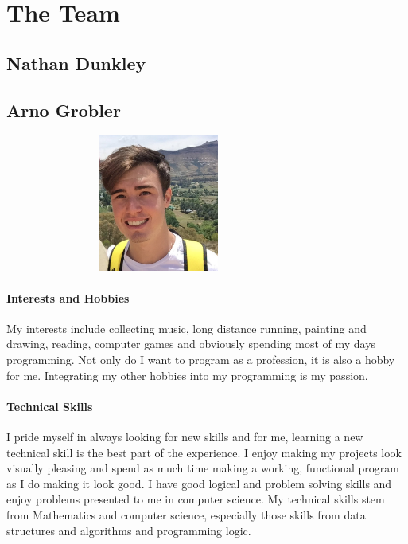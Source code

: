 \documentclass[english]{article}
\begin{document}
	\section{The Team}
		\subsection{Nathan Dunkley}
		
		\subsection{Arno Grobler}
				    \begin{figure}
				\begin{center}
					\includegraphics[width=8cm, height=4.5cm, angle=90]{arno.jpg}
				\end{center}
			\end{figure}
			\paragraph{Interests and Hobbies}
			My interests include collecting music, long distance running, painting and drawing, reading, computer games and obviously spending most of my days programming. Not only do I want to program as a profession, it is also a hobby for me. Integrating my other hobbies into my programming is my passion.
			
			\paragraph{Technical Skills}
            I pride myself in always looking for new skills and for me, learning a new technical skill is the best part of the experience. I enjoy making my projects look visually pleasing and spend as much time making a working, functional program as I do making it look good. I have good logical and problem solving skills and enjoy problems presented to me in computer science. My technical skills stem from Mathematics and computer science, especially those skills from data structures and algorithms and programming logic.
			
\end{document}
